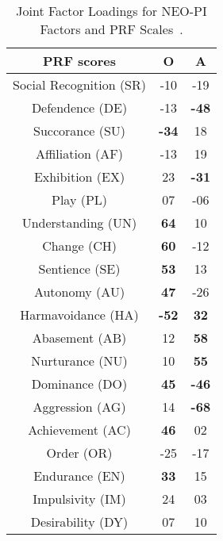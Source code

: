 \begin{table} [h]
    \centering
    \begin{tabular}{c c c}
        \\
        \hline \hline
        PRF scores & \textbf{O}    &\textbf{A}    \\ [0.5ex]
        \hline
        Social Recognition (SR)        & -10 & -19        \\
        Defendence (DE)            & -13 & \textbf{-48}    \\
        Succorance (SU)            & \textbf{-34}    & 18            \\
        Affiliation (AF)                & -13 & 19            \\
        Exhibition (EX)                & 23 & \textbf{-31}    \\
        Play (PL)                    & 07 & -06        \\
        Understanding (UN)            & \textbf{64}    & 10            \\
        Change (CH)                & \textbf{60}    & -12        \\
        Sentience (SE)                & \textbf{53}    & 13            \\
        Autonomy (AU)            & \textbf{47}    & -26        \\
        Harmavoidance (HA)        & \textbf{-52}    & \textbf{32}    \\
        Abasement (AB)            & 12 & \textbf{58}    \\
        Nurturance (NU)            & 10 & \textbf{55}    \\
        Dominance (DO)            & \textbf{45}    & \textbf{-46}    \\
        Aggression (AG)            & 14 & \textbf{-68}    \\
        Achievement (AC)            & \textbf{46}    & 02            \\
        Order (OR)                & -25 & -17        \\
        Endurance (EN)            & \textbf{33}    & 15            \\
        Impulsivity (IM)                & 24 & 03            \\
        Desirability (DY)            & 07 & 10            \\ [1ex]
        \hline \hline
    \end{tabular}
    \caption[]{Joint Factor Loadings for NEO-PI Factors and PRF Scales~\cite{costa1988catalog}\footnotemark.}
    \label{table:2}
\end{table}

